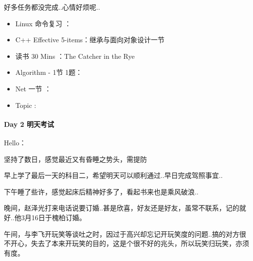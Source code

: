 \documentclass[UTF8,a4paper,8pt]{ctexart}
\begin{document}
		 好多任务都没完成..心情好烦呢.. 
	 	 \begin{itemize}
	 	 	\item  \makebox[0pt][l]{$\square$}\hspace{1em} Linux 命令复习 ：
	 	 	\item  \makebox[0pt][l]{$\square$}\raisebox{.15ex}{\hspace{0.1em}$\checkmark$} C++ Effective 5-items：继承与面向对象设计一节
	 	 	
	 	 	\item  \makebox[0pt][l]{$\square$}\raisebox{.15ex}{\hspace{0.1em}$\checkmark$} 读书  30 Mins	：The Catcher in the Rye	 	 
	 	 	\item  \makebox[0pt][l]{$\square$}\hspace{1em} Algorithm - 1节 1题：
	 	 	\item  \makebox[0pt][l]{$\square$}\hspace{1em} Net 一节 ：
	 	 	
	 	 	\item  \makebox[0pt][l]{$\square$}\raisebox{.15ex}{\hspace{0.1em}$\checkmark$} Topic :
	 	 \end{itemize}
 	 \paragraph{Day 2  明天考试     \quad     }
	 	 Hello：
	 	 
	 	 坚持了数日，感觉最近又有昏睡之势头，需提防
	 	 
	 	 早上学了最后一天的科目二，希望明天可以顺利通过..早日完成驾照事宜..
	 	 
	 	 下午睡了些许，感觉起床后精神好多了，看起书来也是乘风破浪..
	 	 
	 	 晚间，赵泽光打来电话说要订婚..甚是欣喜，好友还是好友，虽常不联系，记的就好..他3月16日于槐柏订婚。
	 	 
	 	 午间，与李飞开玩笑等谈吐之时，因过于高兴却忘记开玩笑度的问题..搞的对方很不开心，失去了本来开玩笑的目的，这是个很不好的兆头，所以玩笑归玩笑，亦须有度。
	 	 
\end{document}
